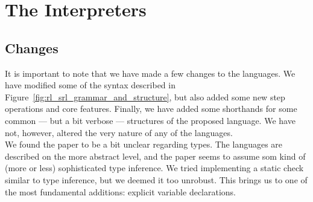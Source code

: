 
\section*{The Interpreters}
%

\subsection*{Changes}
%

%
%
%
%
%


It is important to note that we have made a few changes to the languages. We have modified some of the syntax described in Figure~\ref{fig:rl_srl_grammar_and_structure}, but also added some new step operations and core features. Finally, we have added some shorthands for some common --- but a bit verbose --- structures of the proposed language. We have not, however, altered the very nature of any of the languages.\\

\noindent We found the paper\cite{REV} to be a bit unclear regarding types. The languages are described on the more abstract level, and the paper seems to assume som kind of (more or less) sophisticated type inference. We tried implementing a static check similar to type inference, but we deemed it too unrobust. This brings us to one of the most fundamental additions: explicit variable declarations. \\

